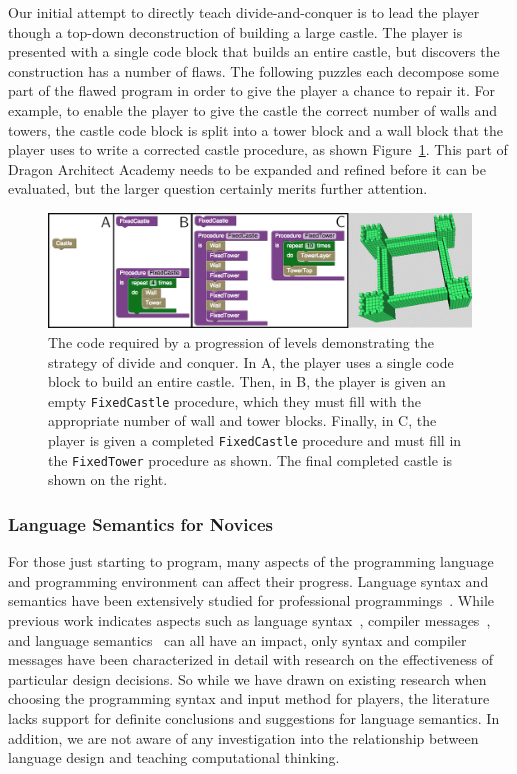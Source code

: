 \documentclass{sig-alternate}
\newcommand{\gametitle}{{\color{RoyalPurple} Dragon Architect Academy}}
\begin{document}
Our initial attempt to directly teach divide-and-conquer is to lead the player though a top-down deconstruction of building a large castle.
The player is presented with a single code block that builds an entire castle, but discovers the construction has a number of flaws. 
The following puzzles each decompose some part of the flawed program in order to give the player a chance to repair it. 
For example, to enable the player to give the castle the correct number of walls and towers, the castle code block is split into a tower block and a wall block that the player uses to write a corrected castle procedure, as shown Figure~\ref{fig:decomp}. 
This part of \gametitle{} needs to be expanded and refined before it can be evaluated, but the larger question certainly merits further attention. 

\begin{figure}[th!]
  \centering
  \includegraphics[width=\textwidth]{images/decomp-code}
  \caption{The code required by a progression of levels demonstrating the strategy of divide and conquer. In A, the player uses a single code block to build an entire castle. Then, in B, the player is given an empty \texttt{FixedCastle} procedure, which they must fill with the appropriate number of wall and tower blocks. Finally, in C, the player is given a completed \texttt{FixedCastle} procedure and must fill in the \texttt{FixedTower} procedure as shown. The final completed castle is shown on the right.}
  \label{fig:decomp}
\end{figure}

\subsubsection{Language Semantics for Novices}

For those just starting to program, many aspects of the programming language and programming environment can affect their progress. 
Language syntax and semantics have been extensively studied for professional programmings~\cite{hudak1994haskell, kennedy2004defining, delorey2007programming}.
While previous work indicates aspects such as language syntax~\cite{stefik2013syntax}, compiler messages~\cite{nienaltowski2008compiler}, and language semantics~\cite{hoc1990language} can all have an impact, only syntax and compiler messages have been characterized in detail with research on the effectiveness of particular design decisions. 
So while we have drawn on existing research when choosing the programming syntax and input method for players, the literature lacks support for definite conclusions and suggestions for language semantics. 
In addition, we are not aware of any investigation into the relationship between language design and teaching computational thinking.
\end{document}
